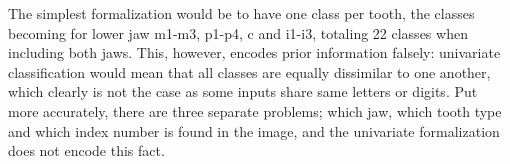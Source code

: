 \documentclass[english,twoside,openright]{UH_DS_MSc}
\begin{document}
The simplest formalization would be to have one class per tooth, the classes becoming for lower jaw m1-m3, p1-p4, c and i1-i3,
totaling 22 classes when including both jaws. This, however, encodes prior information falsely: univariate classification would 
mean that all classes are equally dissimilar to one another, which clearly is not the case as some inputs share same letters or digits.
Put more accurately, there are three separate problems; which jaw, which tooth type and which index number is found in the image, 
and the univariate formalization does not encode this fact.


\end{document}

